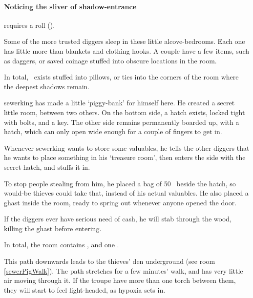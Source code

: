\begin{multicols}{2}
\paragraph{Noticing the sliver of shadow-entrance}
requires a  roll (\tn[9]).


Some of the more trusted \glspl{digger} sleep in these little alcove-bedrooms.
Each one has little more than blankets and clothing hooks.
A couple have a few items, such as daggers, or saved coinage stuffed into obscure locations in the room.

In total, \lootMedium\ exists stuffed into pillows, or ties into the corners of the room where the deepest shadows remain.


\Gls{sewerking} has made a little `piggy-bank' for himself here.
He created a secret little room, between two others.
On the bottom side, a hatch exists, locked tight with bolts, and a key.
The other side remains permanently boarded up, with a hatch, which can only open wide enough for a couple of fingers to get in.

Whenever \gls{sewerking} wants to store some valuables, he tells the other \glspl{digger} that he wants to place something in his `treasure room', then enters the side with the secret hatch, and stuffs it in.

To stop people stealing from him, he placed a bag of 50~ beside the hatch, so would-be thieves could take that, instead of his actual valuables.
He also placed a ghast inside the room, ready to spring out whenever anyone opened the door.

If the \glspl{digger} ever have serious need of cash, he will stab through the wood, killing the ghast before entering.


In total, the room contains \lootBig, and one \lootMagic.

\showTalisman

This path downwards leads to the thieves' den underground (see room \vref{sewerPigWalk}).
The path stretches for a few minutes' walk, and has very little air moving through it.
If the troupe have more than one torch between them, they will start to feel light-headed, as hypoxia sets in.%

\end{multicols}

